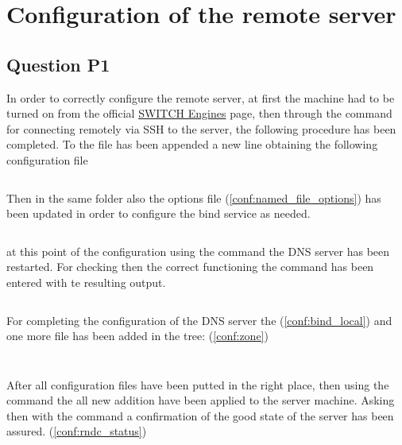 
\section{Configuration of the remote server}

\subsection{Question P1}
In order to correctly configure the remote server, at first the machine had to be turned on from the official \href{https://engines.switch.ch}{SWITCH Engines} page, then through the command  for connecting remotely via SSH to the server, the following procedure has been completed.
To the file  has been appended a new line obtaining the following configuration file 

\inputminted{text}{named.conf.txt}
\label{conf:named_file}

Then in the same folder also the options file (\ref{conf:named_file_options}) has been updated in order to configure the bind service as needed.

\inputminted{text}{named.conf.options.txt}
\label{conf:named_file_options}

at this point of the configuration using the command  the DNS server has been restarted. For checking then the correct functioning the command  has been entered with te resulting output.

\inputminted{text}{bind_status.txt}
\label{conf:bind_status}

For completing the  configuration of the DNS server the  (\ref{conf:bind_local}) and one more file has been added in the tree:  (\ref{conf:zone})

\inputminted{text}{named.conf.local.txt}
\label{conf:bind_local}

\inputminted{text}{zone.txt}
\label{conf:zone}

After all configuration files have been putted in the right place, then using the command  the all new addition have been applied to the server machine.
Asking then with the command  a confirmation of the good state of the server has been assured. (\ref{conf:rndc_status})

